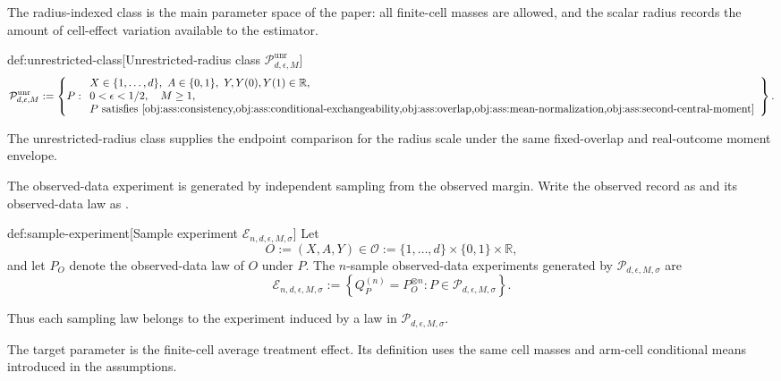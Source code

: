 \documentclass[11pt]{article}
\begin{document}
The radius-indexed class  is the main parameter space of the paper: all finite-cell masses are allowed, and the scalar radius records the amount of cell-effect variation available to the estimator.

\begin{definitionv}{def:unrestricted-class}[Unrestricted-radius class \(\mathcal P_{d,\epsilon,M}^{\mathrm{unr}}\)]
\[
\mathcal P_{d,\epsilon,M}^{\mathrm{unr}}
:=
\left\{
P:
\begin{array}{l}
X\in\{1,\ldots,d\},\ A\in\{0,1\},\ Y,Y(0),Y(1)\in\mathbb R,\\
0<\epsilon<1/2,\quad M\ge 1,\\
P\text{ satisfies }\cref{obj:ass:consistency,obj:ass:conditional-exchangeability,obj:ass:overlap,obj:ass:mean-normalization,obj:ass:second-central-moment}
\end{array}
\right\}.
\]
\end{definitionv}

The unrestricted-radius class  supplies the endpoint comparison for the radius scale under the same fixed-overlap and real-outcome moment envelope.

The observed-data experiment is generated by independent sampling from the observed margin. Write the observed record as  and its observed-data law as .

\begin{definitionv}{def:sample-experiment}[Sample experiment \(\mathcal E_{n,d,\epsilon,M,\sigma}\)]
Let
\[
O:=(X,A,Y)\in\mathcal O:=\{1,\ldots,d\}\times\{0,1\}\times\mathbb R,
\]
and let \(P_O\) denote the observed-data law of \(O\) under \(P\). The \(n\)-sample observed-data experiments generated by \(\mathcal P_{d,\epsilon,M,\sigma}\) are
\[
\mathcal E_{n,d,\epsilon,M,\sigma}
:=
\left\{
Q_P^{(n)}=P_O^{\otimes n}:P\in\mathcal P_{d,\epsilon,M,\sigma}
\right\}.
\]
\end{definitionv}

Thus each sampling law  belongs to the experiment  induced by a law in \(\mathcal P_{d,\epsilon,M,\sigma}\).

The target parameter is the finite-cell average treatment effect. Its definition uses the same cell masses and arm-cell conditional means introduced in the assumptions.
\end{document}
